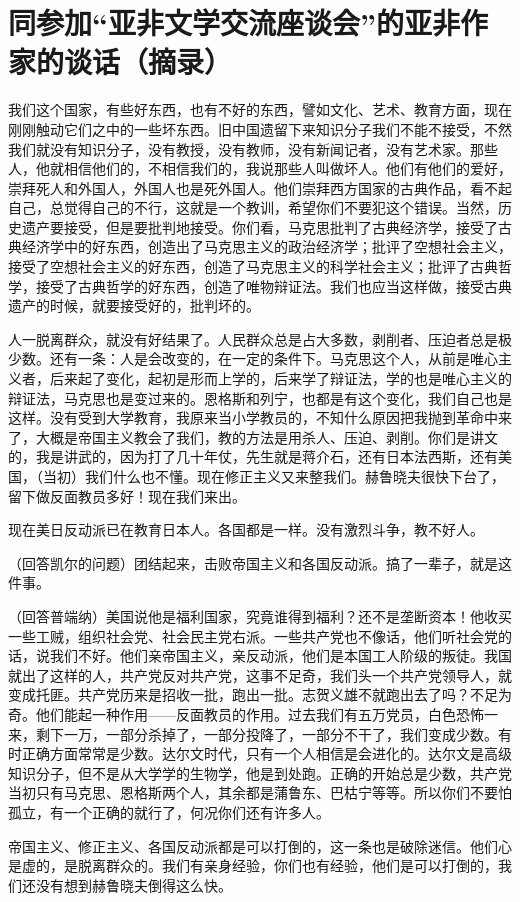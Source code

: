 \section[同参加“亚非文学交流座谈会”的亚非作家的谈话（摘录）（一九六四年十二月二十五日）]{同参加“亚非文学交流座谈会”的亚非作家的谈话（摘录）}


我们这个国家，有些好东西，也有不好的东西，譬如文化、艺术、教育方面，现在刚刚触动它们之中的一些坏东西。旧中国遗留下来知识分子我们不能不接受，不然我们就没有知识分子，没有教授，没有教师，没有新闻记者，没有艺术家。那些人，他就相信他们的，不相信我们的，我说那些人叫做坏人。他们有他们的爱好，崇拜死人和外国人，外国人也是死外国人。他们崇拜西方国家的古典作品，看不起自己，总觉得自己的不行，这就是一个教训，希望你们不要犯这个错误。当然，历史遗产要接受，但是要批判地接受。你们看，马克思批判了古典经济学，接受了古典经济学中的好东西，创造出了马克思主义的政治经济学；批评了空想社会主义，接受了空想社会主义的好东西，创造了马克思主义的科学社会主义；批评了古典哲学，接受了古典哲学的好东西，创造了唯物辩证法。我们也应当这样做，接受古典遗产的时候，就要接受好的，批判坏的。

人一脱离群众，就没有好结果了。人民群众总是占大多数，剥削者、压迫者总是极少数。还有一条：人是会改变的，在一定的条件下。马克思这个人，从前是唯心主义者，后来起了变化，起初是形而上学的，后来学了辩证法，学的也是唯心主义的辩证法，马克思也是变过来的。恩格斯和列宁，也都是有这个变化，我们自己也是这样。没有受到大学教育，我原来当小学教员的，不知什么原因把我抛到革命中来了，大概是帝国主义教会了我们，教的方法是用杀人、压迫、剥削。你们是讲文的，我是讲武的，因为打了几十年仗，先生就是蒋介石，还有日本法西斯，还有美国，（当初）我们什么也不懂。现在修正主义又来整我们。赫鲁晓夫很快下台了，留下做反面教员多好！现在我们来出。

现在美日反动派已在教育日本人。各国都是一样。没有激烈斗争，教不好人。

（回答凯尔的问题）团结起来，击败帝国主义和各国反动派。搞了一辈子，就是这件事。

（回答普端纳）美国说他是福利国家，究竟谁得到福利？还不是垄断资本！他收买一些工贼，组织社会党、社会民主党右派。一些共产党也不像话，他们听社会党的话，说我们不好。他们亲帝国主义，亲反动派，他们是本国工人阶级的叛徒。我国就出了这样的人，共产党反对共产党，这事不足奇，我们头一个共产党领导人，就变成托匪。共产党历来是招收一批，跑出一批。志贺义雄不就跑出去了吗？不足为奇。他们能起一种作用——反面教员的作用。过去我们有五万党员，白色恐怖一来，剩下一万，一部分杀掉了，一部分投降了，一部分不干了，我们变成少数。有时正确方面常常是少数。达尔文时代，只有一个人相信是会进化的。达尔文是高级知识分子，但不是从大学学的生物学，他是到处跑。正确的开始总是少数，共产党当初只有马克思、恩格斯两个人，其余都是蒲鲁东、巴枯宁等等。所以你们不要怕孤立，有一个正确的就行了，何况你们还有许多人。

帝国主义、修正主义、各国反动派都是可以打倒的，这一条也是破除迷信。他们心是虚的，是脱离群众的。我们有亲身经验，你们也有经验，他们是可以打倒的，我们还没有想到赫鲁晓夫倒得这么快。

